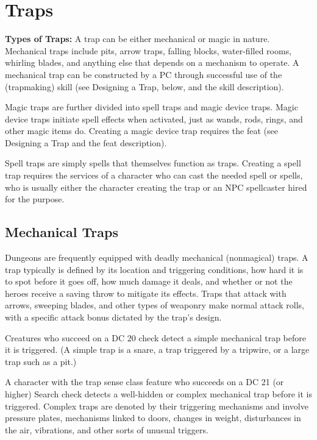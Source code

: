 \section{Traps}

\textbf{Types of Traps:} A trap can be either mechanical or magic in nature. Mechanical 
traps include pits, arrow traps, falling blocks, water-filled rooms, whirling blades, 
and anything else that depends on a mechanism to operate. A mechanical trap can 
be constructed by a PC through successful use of the  (trapmaking) skill (see 
Designing a Trap, below, and the skill description).

Magic traps are further divided into spell traps and magic device traps. Magic 
device traps initiate spell effects when activated, just as wands, rods, rings, 
and other magic items do. Creating a magic device trap requires the 
feat (see Designing a Trap and the feat description).

Spell traps are simply spells that themselves function as traps. Creating 
a spell trap requires the services of a character who can cast the needed spell 
or spells, who is usually either the character creating the trap or an NPC spellcaster 
hired for the purpose.

\subsection{Mechanical Traps}

Dungeons are frequently equipped with deadly mechanical (nonmagical) traps. A trap 
typically is defined by its location and triggering conditions, how hard it is 
to spot before it goes off, how much damage it deals, and whether or not the heroes 
receive a saving throw to mitigate its effects. Traps that attack with arrows, 
sweeping blades, and other types of weaponry make normal attack rolls, with a specific 
attack bonus dictated by the trap's design.

Creatures who succeed on a DC 20  check detect a simple mechanical trap before 
it is triggered. (A simple trap is a snare, a trap triggered by a tripwire, or 
a large trap such as a pit.)

A character with the trap sense class feature who succeeds on a DC 21 (or higher) 
Search check detects a well-hidden or complex mechanical trap before it is triggered. 
Complex traps are denoted by their triggering mechanisms and involve pressure plates, 
mechanisms linked to doors, changes in weight, disturbances in the air, vibrations, 
and other sorts of unusual triggers.

